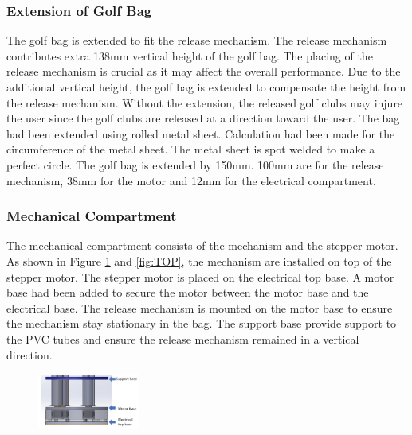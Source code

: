 \documentclass[11pt,landscape]{article}
\begin{document}
\begin{multicols}{3}
    \subsubsection{Extension of Golf Bag}
    The golf bag is extended to fit the release mechanism. The release mechanism
    contributes extra 138mm vertical height of the golf bag. The placing of the
    release mechanism is crucial as it may affect the overall performance. Due
    to the additional vertical height, the golf bag is extended to compensate
    the height from the release mechanism. Without the extension, the released
    golf clubs may injure the user since the golf clubs are released at a
    direction toward the user. The bag had been extended using rolled metal
    sheet. Calculation had been made for the circumference of the metal sheet.
    The metal sheet is spot welded to make a perfect circle. The golf bag is
    extended by 150mm. 100mm are for the release mechanism, 38mm for the motor
    and 12mm for the electrical compartment.
    
    \subsubsection{Mechanical Compartment}
    The mechanical compartment consists of the mechanism and the stepper motor.
    As shown in Figure \ref{fig:SIDE} and \ref{fig:TOP}, the mechanism are
    installed on top of the stepper motor. The stepper motor is placed on the
    electrical top base. A motor base had been added to secure the motor between
    the motor base and the electrical base. The release mechanism is mounted on
    the motor base to ensure the mechanism stay stationary in the bag. The
    support base provide support to the PVC tubes and ensure the release
    mechanism remained in a vertical direction.
    
    \begin{figure}[H]
        \begin{center}
            \includegraphics[width=0.3\textwidth]{Figure6.jpg}
            \label{fig:SIDE}
        \end{center}
    \end{figure}
    

\end{multicols}
\end{document}
